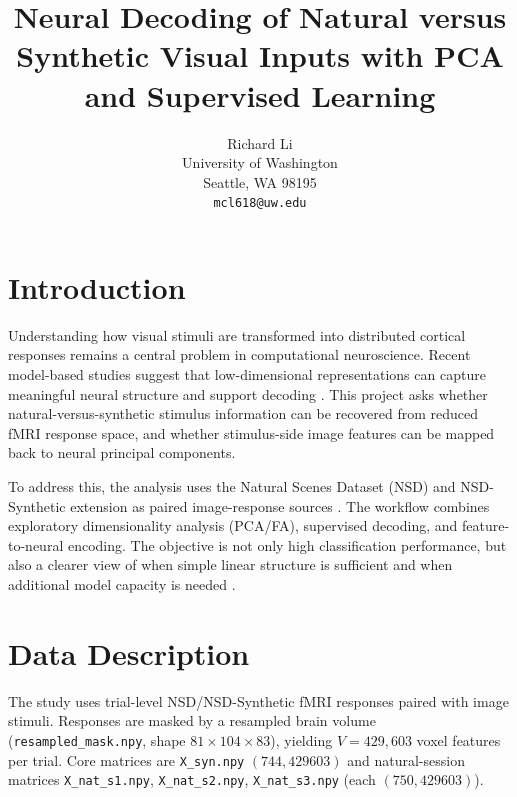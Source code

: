 \documentclass[11pt]{article}
\title{Neural Decoding of Natural versus Synthetic Visual Inputs with PCA and Supervised Learning}
\author{
  Richard Li \\
  University of Washington \\
  Seattle, WA 98195 \\
  \texttt{mcl618@uw.edu} \\
}
\begin{document}
\singlespacing

\maketitle

\section{Introduction}
Understanding how visual stimuli are transformed into distributed cortical responses remains a central problem in computational neuroscience. Recent model-based studies suggest that low-dimensional representations can capture meaningful neural structure and support decoding \citep{yamins2016goal,wen2018neural,guclu2015deep}. This project asks whether natural-versus-synthetic stimulus information can be recovered from reduced fMRI response space, and whether stimulus-side image features can be mapped back to neural principal components.

To address this, the analysis uses the Natural Scenes Dataset (NSD) and NSD-Synthetic extension as paired image-response sources \citep{allen2022nsd,nsdsynthetic2024}. The workflow combines exploratory dimensionality analysis (PCA/FA), supervised decoding, and feature-to-neural encoding. The objective is not only high classification performance, but also a clearer view of when simple linear structure is sufficient and when additional model capacity is needed \citep{haxby2001distributed,kamitani2005decoding,norman2006beyond}.

\section{Data Description}
The study uses trial-level NSD/NSD-Synthetic fMRI responses paired with image stimuli. Responses are masked by a resampled brain volume (\texttt{resampled\_mask.npy}, shape $81 \times 104 \times 83$), yielding $V=429{,}603$ voxel features per trial. Core matrices are \texttt{X\_syn.npy} $(744,429603)$ and natural-session matrices \texttt{X\_nat\_s1.npy}, \texttt{X\_nat\_s2.npy}, \texttt{X\_nat\_s3.npy} (each $(750,429603)$).
\end{document}
